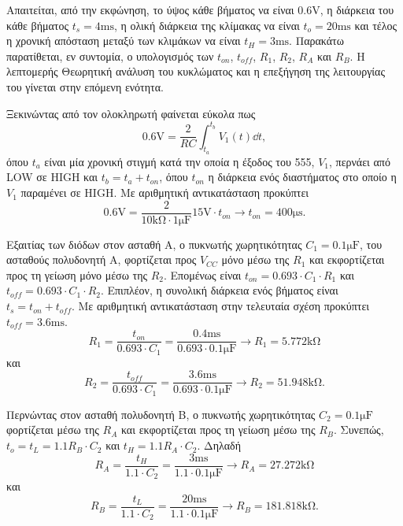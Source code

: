 Απαιτείται, από την εκφώνηση, το ύψος κάθε βήματος να είναι $0.6\unit{\volt}$, η διάρκεια του κάθε βήματος $t_s=4\unit{\ms}$, η ολική διάρκεια της κλίμακας να είναι $t_o=20\unit{\ms}$ και τέλος η χρονική απόσταση μεταξύ των κλιμάκων να είναι $t_H=3\unit{\ms}$. Παρακάτω παρατίθεται, εν συντομία, ο υπολογισμός των $t_{on}$, $t_{off}$, $R_1$, $R_2$, $R_A$ και $R_B$. Η λεπτομερής Θεωρητική ανάλυση του κυκλώματος και η επεξήγηση της λειτουργίας του γίνεται στην επόμενη ενότητα.\par
Ξεκινώντας από τον ολοκληρωτή φαίνεται εύκολα πως
\begin{equation*}
	0.6\unit{\volt}=\frac{2}{RC}\int_{t_a}^{t_b}{V_1(t)\dd{t}},
\end{equation*}
όπου $t_a$ είναι μία χρονική στιγμή κατά την οποία η έξοδος του 555, $V_1$, περνάει από LOW σε HIGH και $t_b=t_a+t_{on}$, όπου $t_{on}$ η διάρκεια ενός διαστήματος στο οποίο η $V_1$ παραμένει σε HIGH. Με αριθμητική αντικατάσταση προκύπτει
\begin{equation*}
	0.6\unit{\volt}=\frac{2}{10\unit{\kilo\ohm}\cdot 1\unit{\micro\farad}}15\unit{\volt}\cdot t_{on}\rightarrow t_{on}=400\unit{\micro\second}.
\end{equation*}

Εξαιτίας των διόδων στον ασταθή Α, ο πυκνωτής χωρητικότητας $C_1=0.1\unit{\micro\farad}$, του ασταθούς πολυδονητή Α, φορτίζεται προς $V_{CC}$ μόνο μέσω της $R_1$ και εκφορτίζεται προς τη γείωση μόνο μέσω της $R_2$. Επομένως είναι $t_{on}=0.693\cdot C_1\cdot R_1$ και $t_{off}=0.693\cdot C_1\cdot R_2$. Επιπλέον, η συνολική διάρκεια ενός βήματος είναι $t_s=t_{on}+t_{off}$. Με αριθμητική αντικατάσταση στην τελευταία σχέση προκύπτει $t_{off}=3.6\unit{\ms}$.
\begin{equation*}
	R_1=\frac{t_{on}}{0.693\cdot C_1}=\frac{0.4\unit{\ms}}{0.693\cdot 0.1\unit{\micro\farad}}\rightarrow R_1=5.772\unit{\kilo\ohm}
\end{equation*}
και
\begin{equation*}
	R_2=\frac{t_{off}}{0.693\cdot C_1}=\frac{3.6\unit{\ms}}{0.693\cdot 0.1\unit{\micro\farad}}\rightarrow R_2=51.948\unit{\kilo\ohm}.
\end{equation*}

Περνώντας στον ασταθή πολυδονητή Β, ο πυκνωτής χωρητικότητας $C_2=0.1\unit{\micro\farad}$ φορτίζεται μέσω της $R_A$ και εκφορτίζεται προς τη γείωση μέσω της $R_B$. Συνεπώς, $t_o=t_L=1.1R_B\cdot C_2$ και $t_H=1.1R_A\cdot C_2$. Δηλαδή
\begin{equation*}
	R_Α=\frac{t_{H}}{1.1\cdot C_2}=\frac{3\unit{\ms}}{1.1\cdot 0.1\unit{\micro\farad}}\rightarrow R_A=27.272\unit{\kilo\ohm}
\end{equation*}
και
\begin{equation*}
	R_B=\frac{t_{L}}{1.1\cdot C_2}=\frac{20\unit{\ms}}{1.1\cdot 0.1\unit{\micro\farad}}\rightarrow R_B=181.818\unit{\kilo\ohm}.
\end{equation*}